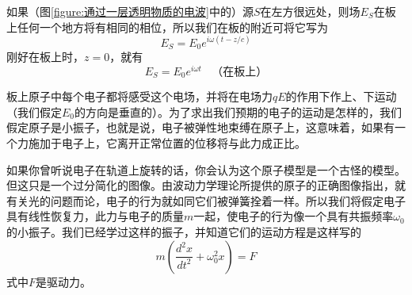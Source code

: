 \begin{table}[!ht]
    \centering
    \caption{计算中所用的符号}
    \label{Table:31:1}
\end{table}

如果（图\ref{figure:通过一层透明物质的电波}中的）源$S$在左方很远处，则场$E_S$在板上任何一个地方将有相同的相位，所以我们在板的附近可将它写为
\begin{equation}
    \label{Eq:I:31:9}
    E_S=E_0e^{i\omega(t-z/c)}
\end{equation}
刚好在板上时，$z=0$，就有
\begin{equation}
    \label{Eq:I:31:10}
    E_S = E_0e^{i\omega t} ~~~~ \text{（在板上）}
\end{equation}

板上原子中每个电子都将感受这个电场，并将在电场力$qE$的作用下作上、下运动（我们假定$E_0$的方向是垂直的）。为了求出我们预期的电子的运动是怎样的，我们假定原子是小振子，也就是说，电子被弹性地束缚在原子上，这意味着，如果有一个力施加于电子上，它离开正常位置的位移将与此力成正比。

如果你曾听说电子在轨道上旋转的话，你会认为这个原子模型是一个古怪的模型。但这只是一个过分简化的图像。由波动力学理论所提供的原子的正确图像指出，就有关光的问题而论，电子的行为就如同它们被弹簧拴着一样。所以我们将假定电子具有线性恢复力，此力与电子的质量$m$一起，使电子的行为像一个具有共振频率$\omega_0$的小振子。我们已经学过这样的振子，并知道它们的运动方程是这样写的
\begin{equation}
    \label{Eq:I:31:11}
    m\left ( \frac{d^2x}{dt^2} + \omega_0^2x \right ) = F
\end{equation}
式中$F$是驱动力。

